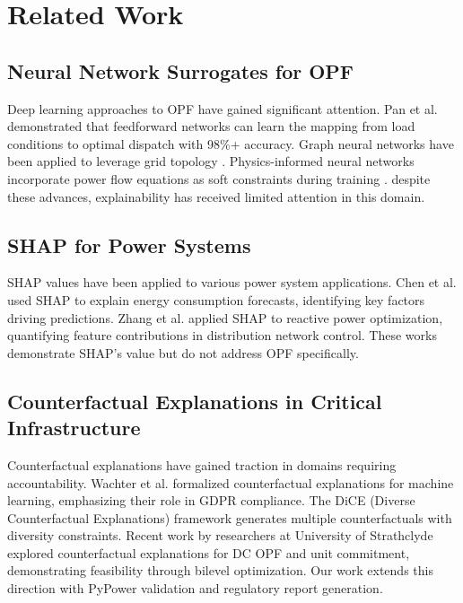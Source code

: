 \documentclass[journal,12pt,onecolumn]{IEEEtran}
\begin{document}
\section{Related Work}
\label{sec:related_work}

\subsection{Neural Network Surrogates for OPF}

Deep learning approaches to OPF have gained significant attention. Pan et al. \cite{ref8} demonstrated that feedforward networks can learn the mapping from load conditions to optimal dispatch with 98\%+ accuracy. Graph neural networks have been applied to leverage grid topology \cite{ref9}. Physics-informed neural networks incorporate power flow equations as soft constraints during training \cite{ref10}. despite these advances, explainability has received limited attention in this domain.

\subsection{SHAP for Power Systems}

SHAP values have been applied to various power system applications. Chen et al. \cite{ref11} used SHAP to explain energy consumption forecasts, identifying key factors driving predictions. Zhang et al. \cite{ref12} applied SHAP to reactive power optimization, quantifying feature contributions in distribution network control. These works demonstrate SHAP's value but do not address OPF specifically.

\subsection{Counterfactual Explanations in Critical Infrastructure}

Counterfactual explanations have gained traction in domains requiring accountability. Wachter et al. \cite{ref7} formalized counterfactual explanations for machine learning, emphasizing their role in GDPR compliance. The DiCE (Diverse Counterfactual Explanations) framework \cite{ref13} generates multiple counterfactuals with diversity constraints. Recent work by researchers at University of Strathclyde \cite{ref14} explored counterfactual explanations for DC OPF and unit commitment, demonstrating feasibility through bilevel optimization. Our work extends this direction with PyPower validation and regulatory report generation.
\end{document}

